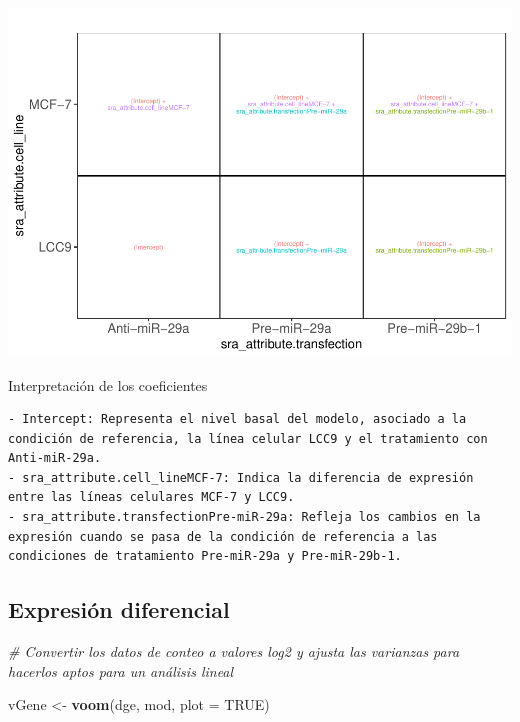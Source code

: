 \documentclass[
]{article}
\newenvironment{Shaded}{\begin{snugshade}}{\end{snugshade}}
\newcommand{\AttributeTok}[1]{\textcolor[rgb]{0.13,0.29,0.53}{#1}}
\newcommand{\CommentTok}[1]{\textcolor[rgb]{0.56,0.35,0.01}{\textit{#1}}}
\newcommand{\ConstantTok}[1]{\textcolor[rgb]{0.56,0.35,0.01}{#1}}
\newcommand{\FunctionTok}[1]{\textcolor[rgb]{0.13,0.29,0.53}{\textbf{#1}}}
\newcommand{\NormalTok}[1]{#1}
\newcommand{\OtherTok}[1]{\textcolor[rgb]{0.56,0.35,0.01}{#1}}
\begin{document}
\includegraphics{Proyecto_RNAseq_files/figure-latex/unnamed-chunk-11-1.pdf}

Interpretación de los coeficientes

\begin{verbatim}
- Intercept: Representa el nivel basal del modelo, asociado a la condición de referencia, la línea celular LCC9 y el tratamiento con Anti-miR-29a.
- sra_attribute.cell_lineMCF-7: Indica la diferencia de expresión entre las líneas celulares MCF-7 y LCC9.
- sra_attribute.transfectionPre-miR-29a: Refleja los cambios en la expresión cuando se pasa de la condición de referencia a las condiciones de tratamiento Pre-miR-29a y Pre-miR-29b-1.
\end{verbatim}

\subsection{Expresión diferencial}\label{expresiuxf3n-diferencial}

\begin{Shaded}
\begin{Highlighting}[]
\CommentTok{\# Convertir los datos de conteo a valores log2 y ajusta las varianzas para hacerlos aptos para un análisis lineal }

\NormalTok{vGene }\OtherTok{\textless{}{-}} \FunctionTok{voom}\NormalTok{(dge, mod, }\AttributeTok{plot =} \ConstantTok{TRUE}\NormalTok{)}
\end{Highlighting}
\end{Shaded}
\end{document}
